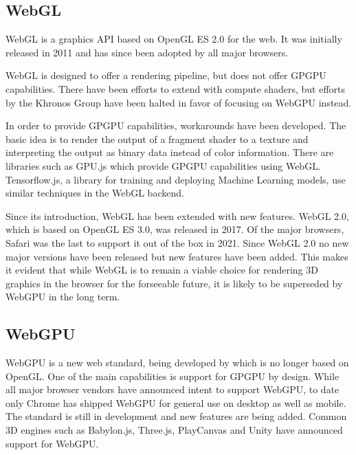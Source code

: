 \subsection{WebGL}

\gls{WebGL} is a graphics \gls{API} based on \gls{OpenGL ES} 2.0 for the web. It was initially released in 2011 and has since been adopted by all major browsers.

\gls{WebGL} is designed to offer a rendering pipeline, but does not offer \gls{GPGPU} capabilities. There have been efforts to extend with compute shaders, but efforts by the \gls{Khronos Group} have been halted in favor of focusing on WebGPU instead.

In order to provide \gls{GPGPU} capabilities, workarounds have been developed. The basic idea is to render the output of a fragment shader to a texture and interpreting the output as binary data instead of color information.
There are libraries such as GPU.js which provide \gls{GPGPU} capabilities using \gls{WebGL}. Tensorflow.js, a library for training and deploying Machine Learning models, use similar techniques in the \gls{WebGL} backend.

Since its introduction, \gls{WebGL} has been extended with new features. \gls{WebGL} 2.0, which is based on \gls{OpenGL ES} 3.0, was released in 2017. Of the major browsers, Safari was the last to support it out of the box in 2021. Since \gls{WebGL} 2.0 no new major versions have been released but new features have been added. This makes it evident that while \gls{WebGL} is to remain a viable choice for rendering 3D graphics in the browser for the forseeable future, it is likely to be superseded by WebGPU in the long term.

\subsection{WebGPU}

WebGPU is a new web standard, being developed by  which is no longer based on \gls{OpenGL}. One of the main capabilities is support for \gls{GPGPU} by design. While all major browser vendors have announced intent to support WebGPU, to date only Chrome has shipped WebGPU for general use on desktop as well as mobile.
The standard is still in development and new features are being added.
Common 3D engines such as \gls{Babylon.js}, \gls{Three.js}, \gls{PlayCanvas} and \gls{Unity} have announced support for WebGPU.

